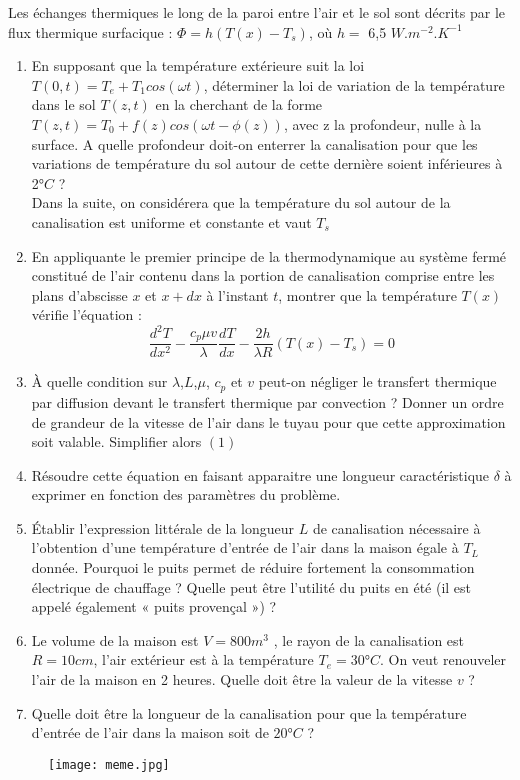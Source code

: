 \documentclass{article}
\begin{document}
\begin{enumerate}
Les échanges thermiques le long de la paroi entre l’air et le sol sont décrits par le flux thermique surfacique : $\Phi = h(T(x)-T_s)$, où $h=$ 6,5 $W.m^{-2}.K^{-1}$
\begin{enumerate}
    \item En supposant que la température extérieure suit la loi $T(0,t) = T_e + T_1 cos(\omega t)$, déterminer la loi de variation de la température dans le sol $T(z,t)$ en la cherchant de la forme $T(z,t) = T_0 + f(z)cos(\omega t - \phi(z))$, avec z la profondeur, nulle à la surface. A quelle profondeur doit-on enterrer la canalisation pour que les variations de température du sol autour de cette dernière soient inférieures à 2°$C$ ? 
    \\
    Dans la suite, on considérera  que la température du sol autour de la canalisation est uniforme et constante et vaut $T_s$
    \item En appliquante le premier principe de la thermodynamique au système fermé constitué de l'air contenu dans la portion de canalisation comprise entre les plans d'abscisse $x$ et $x+dx$ à l'instant $t$, montrer que la température $T(x)$ vérifie l'équation : 
    \begin{equation}
        \frac{d^2T}{dx^2} - \frac{c_p \mu v}{\lambda} \frac{dT}{dx} - \frac{2h}{\lambda R} (T(x)-T_s)=0
    \end{equation}
    \item À quelle condition sur $\lambda$,$L$,$\mu$, $c_p$ et $v$ peut-on  négliger le transfert thermique par diffusion devant le transfert thermique par convection  ? Donner un ordre de grandeur de la vitesse de l'air dans le tuyau pour que cette approximation soit valable. Simplifier alors $(1)$
    \item Résoudre cette équation en faisant apparaitre une longueur caractéristique $\delta$ à exprimer en
fonction des paramètres du problème. 
\item  Établir l’expression littérale de la longueur $L $ de canalisation nécessaire à l’obtention d’une
température d’entrée de l’air dans la maison égale à $T_L$ donnée. Pourquoi le puits permet de
réduire fortement la consommation électrique de chauffage ? Quelle peut être l’utilité du puits
en été (il est appelé également « puits provençal ») ? 
\item  Le volume de la maison est $V = 800 m^3$ , le rayon de la canalisation est $R = 10 cm$, l'air
extérieur est à la température $T_e = 30$°$C$. On veut renouveler l’air de la maison en 2 heures.
Quelle doit être la valeur de la vitesse $ v$ ? 
\item Quelle doit être la longueur de la canalisation pour que la température d’entrée de l’air
dans la maison soit de $20$°$C $ ? \\[1cm]
\end{enumerate}

\end{enumerate}


\begin{figure}[h]
  \centering
  \texttt{[image: meme.jpg]}
\end{figure}
\end{document}
